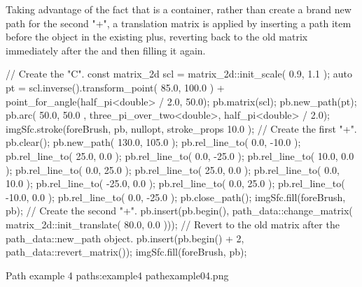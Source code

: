 \pnum
Taking advantage of the fact that  is a container, rather than create a brand new path for the second "+", a translation matrix is applied by inserting a  path item before the  object in the existing plus, reverting back to the old matrix immediately after the  and then filling it again.

\begin{codeblock}
// Create the "C".
const matrix_2d scl = matrix_2d::init_scale({ 0.9, 1.1 });
auto pt = scl.inverse().transform_point({ 85.0, 100.0 }) +
  point_for_angle(half_pi<double> / 2.0, 50.0);
pb.matrix(scl);
pb.new_path(pt);
pb.arc({ 50.0, 50.0 }, three_pi_over_two<double>, half_pi<double> / 2.0);
imgSfc.stroke(foreBrush, pb, nullopt, stroke_props{ 10.0 });
// Create the first "+".
pb.clear();
pb.new_path({ 130.0, 105.0 });
pb.rel_line_to({ 0.0, -10.0 });
pb.rel_line_to({ 25.0, 0.0 });
pb.rel_line_to({ 0.0, -25.0 });
pb.rel_line_to({ 10.0, 0.0 });
pb.rel_line_to({ 0.0, 25.0 });
pb.rel_line_to({ 25.0, 0.0 });
pb.rel_line_to({ 0.0, 10.0 });
pb.rel_line_to({ -25.0, 0.0 });
pb.rel_line_to({ 0.0, 25.0 });
pb.rel_line_to({ -10.0, 0.0 });
pb.rel_line_to({ 0.0, -25.0 });
pb.close_path();
imgSfc.fill(foreBrush, pb);
// Create the second "+".
pb.insert(pb.begin(), path_data::change_matrix(
  matrix_2d::init_translate({ 80.0, 0.0 })));
// Revert to the old matrix after the path_data::new_path object.
pb.insert(pb.begin() + 2, path_data::revert_matrix());
imgSfc.fill(foreBrush, pb);
\end{codeblock}

\begin{importgraphiciotwod}
{Path example 4}
{paths:example4}
{pathexample04.png}
\end{importgraphiciotwod}

\FloatBarrier
%
%
%
%
%
%
